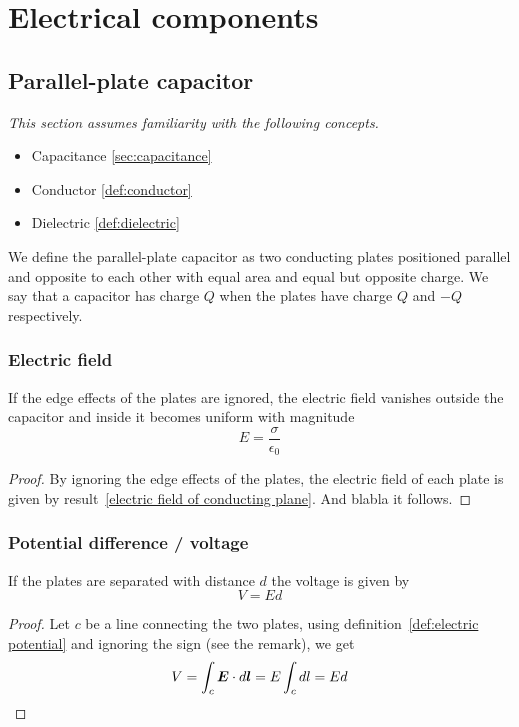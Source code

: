 \chapter{Electrical components}


\section{Parallel-plate capacitor}

\emph{This section assumes familiarity with the following concepts.}
\begin{itemize}
\item Capacitance \ref{sec:capacitance}
\item Conductor \ref{def:conductor}
\item Dielectric \ref{def:dielectric}
\end{itemize}

We define the parallel-plate capacitor as two conducting plates
positioned parallel and opposite to each other with equal area and
equal but opposite charge. We say that a capacitor has charge $Q$ when
the plates have charge $Q$ and $-Q$ respectively.

\subsection{Electric field}
\label{capacitor electric field}

If the edge effects of the plates are ignored, the electric field
vanishes outside the capacitor and inside it becomes uniform with
magnitude
\begin{equation*}
  E=\frac{\sigma}{\epsilon_0}
\end{equation*}
\begin{proof}
  By ignoring the edge effects of the plates, the electric field of each
  plate is given by result~\ref{electric field of conducting
    plane}. And blabla it follows.
\end{proof}


\subsection{Potential difference / voltage}
\label{capacitor voltage}

If the plates are separated with distance $d$ the voltage is given by
\begin{equation*}
  V = Ed
\end{equation*}

\begin{proof}
  Let $c$ be a line connecting the two plates, using
  definition~\ref{def:electric potential} and ignoring the sign (see
  the remark), we get
  \begin{equation*}
    V = \int_c \vec{E}\cdot d\vec{l} = E\int_c dl = Ed \qedhere
  \end{equation*}
\end{proof}

